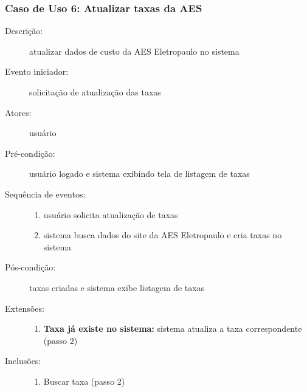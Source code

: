 \subsubsection{Caso de Uso 6: Atualizar taxas da AES}
\begin{description}
	\item[Descrição:] atualizar dados de custo da AES Eletropaulo no sistema
	\item[Evento iniciador:] solicitação de atualização das taxas
	\item[Atores:] usuário
	\item[Pré-condição:] usuário logado e sistema exibindo tela de listagem de taxas
	\item[Sequência de eventos:] \hfill
		\begin{enumerate}
			\item{usuário solicita atualização de taxas}
			\item{sistema busca dados do site da AES Eletropaulo e cria taxas no sistema}
		\end{enumerate}
	\item[Pós-condição:] taxas criadas e sistema exibe listagem de taxas
	\item[Extensões:] \hfill
		\begin{enumerate}
			\item{\textbf{Taxa já existe no sistema:} sistema atualiza a taxa correspondente (passo 2)}
		\end{enumerate}
	\item[Inclusões:] \hfill
		\begin{enumerate}
			\item{Buscar taxa (passo 2)}
		\end{enumerate}
\end{description}
